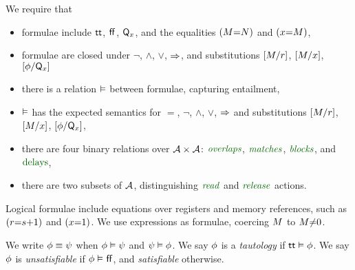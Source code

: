 We require that
\begin{itemize}
\item formulae include $\mathsf{tt}$, $\mkern.6mu\mathsf{ff}\mkern.6mu$, $\mathsf{Q}_{x}$, and the equalities $(M{=}N)$ and $(x{=}M)$,
\item formulae are closed under $\lnot$, $\land$, $\lor$, $\mathbin{\Rightarrow}$, and
  substitutions $[M/r]$, $[M/x]$, $[\phi/\mathsf{Q}_{x}]$
\item there is a relation $\mathrel{\vDash}$ between
  formulae, capturing entailment, %
\item $\mathrel{\vDash}$ has the expected semantics for $=$, $\lnot$,
  $\land$, $\lor$, $\mathbin{\Rightarrow}$ and substitutions $[M/r]$,
  $[M/x]$, $[\phi/\mathsf{Q}_{x}]$,
\item there are four binary relations over $\mathcal{A}\times\mathcal{A}$:
  $\roverlapsdef$, $\rmatchesdef$, $\rblocksdef$, and $\rdelays$,
\item there are two subsets of $\mathcal{A}$, distinguishing
  $\sreaddef$ and $\sreleasedef$ actions.
\end{itemize}

Logical formulae include equations over registers and memory references, such as
$(r{=}s{+}1)$ and $(x{=}1)$.
We use expressions as formulae, coercing $M$ to $M{\neq}0$.


We write $\phi\mathrel{\equiv}\psi$ when $\phi\mathrel{\vDash}\psi$ and $\psi\mathrel{\vDash}\phi$.
We say
$\phi$ is a \emph{tautology} if $\mathsf{tt} \mathrel{\vDash} \phi$.
We say
$\phi$ is \emph{unsatisfiable} if $\phi \mathrel{\vDash} \mkern.6mu\mathsf{ff}\mkern.6mu$, and
\emph{satisfiable} otherwise.




